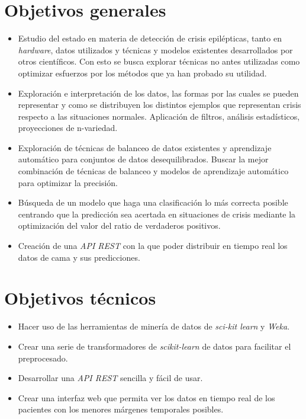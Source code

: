 
\section{Objetivos generales}

\begin{itemize}
	\item Estudio del estado en materia de detección de crisis epilépticas, tanto en \textit{hardware}, datos utilizados y técnicas y modelos existentes desarrollados por otros científicos. Con esto se busca explorar técnicas no antes utilizadas como optimizar esfuerzos por los métodos que ya han probado su utilidad.
	\item Exploración e interpretación de los datos, las formas por las cuales se pueden representar y como se distribuyen los distintos ejemplos que representan crisis respecto a las situaciones normales. Aplicación de filtros, análisis estadísticos, proyecciones de n-variedad.
	\item Exploración de técnicas de balanceo de datos existentes y aprendizaje automático para conjuntos de datos desequilibrados. Buscar la mejor combinación de técnicas de balanceo y modelos de aprendizaje automático para optimizar la precisión.
	\item Búsqueda de un modelo que haga una clasificación lo más correcta posible centrando que la predicción sea acertada en situaciones de crisis mediante la optimización del valor del ratio de verdaderos positivos.
	\item Creación de una \textit{API REST} con la que poder distribuir en tiempo real los datos de cama y sus predicciones.
\end{itemize}

\section{Objetivos técnicos}

\begin{itemize}
	\item Hacer uso de las herramientas de minería de datos de \textit{sci-kit learn} y \textit{Weka}.
	\item Crear una serie de transformadores de \textit{scikit-learn} de datos para facilitar el preprocesado.
	\item Desarrollar una \textit{API REST} sencilla y fácil de usar.
	\item Crear una interfaz web que permita ver los datos en tiempo real de los pacientes con los menores márgenes temporales posibles.
\end{itemize}

